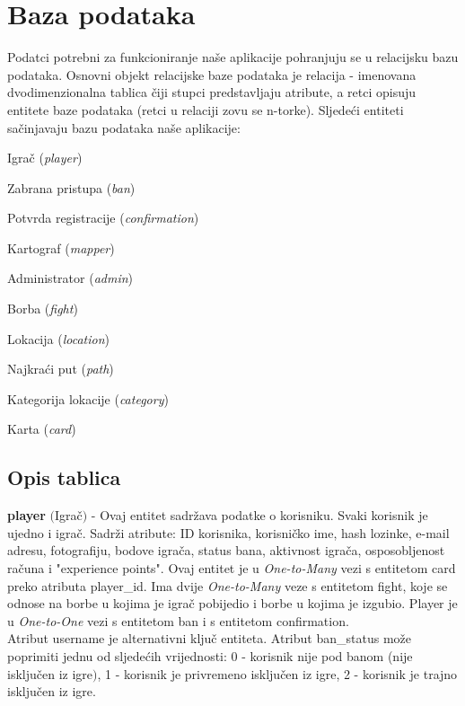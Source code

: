 				
		\section{Baza podataka}
			
			Podatci potrebni za funkcioniranje naše aplikacije pohranjuju se u relacijsku bazu podataka. Osnovni objekt relacijske baze podataka je relacija - imenovana dvodimenzionalna tablica čiji stupci predstavljaju atribute, a retci opisuju entitete baze podataka (retci u relaciji zovu se n-torke).
			Sljedeći entiteti sačinjavaju bazu podataka naše aplikacije:
			\begin{packed_item}
				\item Igrač (\textit{player})
				\item Zabrana pristupa (\textit{ban})
				\item Potvrda registracije (\textit{confirmation})
				\item Kartograf (\textit{mapper})
				\item Administrator (\textit{admin})
				\item Borba (\textit{fight})
				\item Lokacija (\textit{location})
				\item Najkraći put (\textit{path})
				\item Kategorija lokacije (\textit{category})
				\item Karta (\textit{card})
			\end{packed_item}
			
			\subsection{Opis tablica}
			
				\noindent\textbf{player} $($Igrač$)$ - Ovaj entitet sadržava podatke o korisniku. Svaki korisnik je ujedno i igrač. Sadrži atribute: ID korisnika, korisničko ime, hash lozinke, e-mail adresu, fotografiju, bodove igrača, status bana, aktivnost igrača, osposobljenost računa i "experience points". Ovaj entitet je u \textit{One-to-Many} vezi s entitetom card preko atributa player\_id. Ima dvije \textit{One-to-Many} veze s entitetom fight, koje se odnose na borbe u kojima je igrač pobijedio i borbe u kojima je izgubio. Player je u \textit{One-to-One} vezi s entitetom ban i s entitetom confirmation. \\
				Atribut username je alternativni ključ entiteta. Atribut ban\_status može poprimiti jednu od sljedećih vrijednosti: 0 - korisnik nije pod banom (nije isključen iz igre$)$, 1 - korisnik je privremeno isključen iz igre, 2 - korisnik je trajno isključen iz igre.
				
